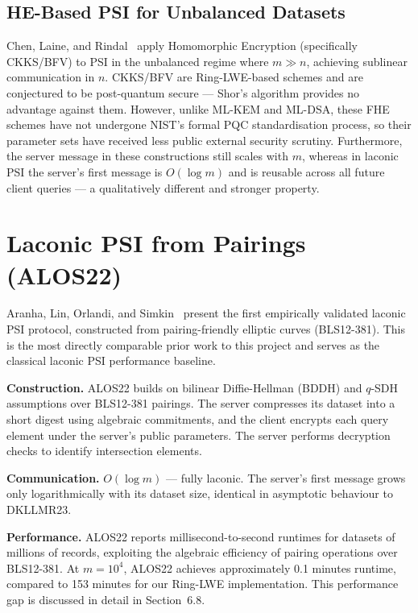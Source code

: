 \subsection{HE-Based PSI for Unbalanced Datasets}
Chen, Laine, and Rindal~\cite{chen2017fhe} apply Homomorphic Encryption
(specifically CKKS/BFV) to PSI in the unbalanced regime where $m \gg n$, achieving
sublinear communication in $n$. CKKS/BFV are Ring-LWE-based schemes and are
conjectured to be post-quantum secure --- Shor's algorithm provides no advantage
against them. However, unlike ML-KEM and ML-DSA, these FHE schemes have not
undergone NIST's formal PQC standardisation process, so their parameter sets have
received less public external security scrutiny. Furthermore, the server message in
these constructions still scales with $m$, whereas in laconic PSI the server's first
message is $O(\log m)$ and is reusable across all future client queries ---
a qualitatively different and stronger property.

\section{Laconic PSI from Pairings (ALOS22)}

Aranha, Lin, Orlandi, and Simkin~\cite{alos2022} present the first empirically
validated laconic PSI protocol, constructed from pairing-friendly elliptic curves
(BLS12-381). This is the most directly comparable prior work to this project and
serves as the classical laconic PSI performance baseline.

\textbf{Construction.} ALOS22 builds on bilinear Diffie-Hellman (BDDH) and
$q$-SDH assumptions over BLS12-381 pairings. The server compresses its dataset
into a short digest using algebraic commitments, and the client encrypts each
query element under the server's public parameters. The server performs decryption
checks to identify intersection elements.

\textbf{Communication.} $O(\log m)$ --- fully laconic. The server's first message
grows only logarithmically with its dataset size, identical in asymptotic behaviour
to DKLLMR23.

\textbf{Performance.} ALOS22 reports millisecond-to-second runtimes for datasets
of millions of records, exploiting the algebraic efficiency of pairing operations
over BLS12-381. At $m = 10^4$, ALOS22 achieves approximately 0.1 minutes runtime,
compared to 153 minutes for our Ring-LWE implementation. This performance gap is
discussed in detail in Section~6.8.


